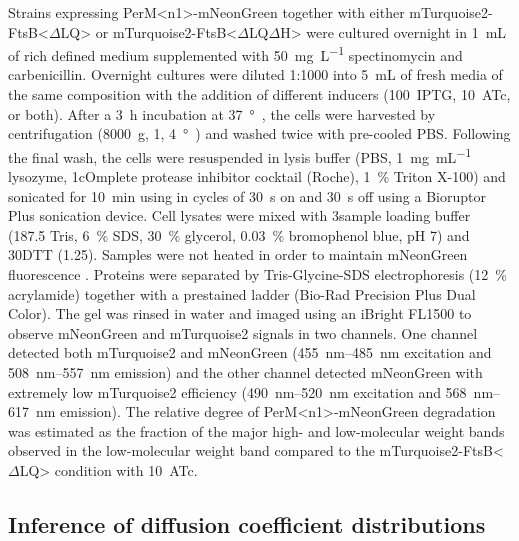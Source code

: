 \documentclass[pdflatex,sn-nature]{sn-jnl}%
\def\textsuperscript#1{<#1>}%
\newcommand\ftsbdLQ{FtsB\textsuperscript{$\Delta{}$LQ}}
\newcommand\ftsbdLQdH{FtsB\textsuperscript{$\Delta{}$LQ$\Delta{}$H}}
\newcommand\permN{PerM\textsuperscript{n1}}
\begin{document}
Strains expressing \permN{}-mNeonGreen together with either mTurquoise2-\ftsbdLQ{} or mTurquoise2-\ftsbdLQdH{} were cultured overnight in \qty{1}{\mL} of rich defined medium supplemented with \qty{50}{\mg\per\L}  spectinomycin and carbenicillin.
Overnight cultures were diluted 1:1000 into \qty{5}{mL} of fresh media of the same composition with the addition of different inducers (\qty{100}{\uM}~IPTG, \qty{10}{\nM}~ATc, or both).
After a \qty{3}{\hour} incubation at \qty{37}{\degree\C}, the cells were harvested by centrifugation (\qty{8000}{g}, \qty{1}{\min}, \qty{4}{\degree\C}) and washed twice with pre-cooled PBS.
Following the final wash, the cells were resuspended in lysis buffer (PBS, \qty{1}{\mg\per\mL} lysozyme, 1\texttimes cOmplete protease inhibitor cocktail (Roche), \qty{1}{\percent} Triton X-100) and sonicated for \qty{10}{min} using in cycles of \qty{30}{s} on and \qty{30}{s} off using a Bioruptor Plus sonication device.
Cell lysates were mixed with 3\texttimes sample loading buffer (\qty{187.5}{\mM} Tris, \qty{6}{\percent} SDS, \qty{30}{\percent} glycerol, \qty{0.03}{\percent} bromophenol blue, pH 7) and 30\texttimes DTT (\qty{1.25}{\molar}).
Samples were not heated in order to maintain mNeonGreen fluorescence \citep{sanialDirectObservationFluorescent2024}.
Proteins were separated by Tris-Glycine-SDS electrophoresis (\qty{12}{\percent} acrylamide) together with a prestained ladder (Bio-Rad Precision Plus Dual Color).
The gel was rinsed in water and imaged using an iBright FL1500 to observe mNeonGreen and mTurquoise2 signals in two channels.
One channel detected both mTurquoise2 and mNeonGreen (\qtyrange{455}{485}{\nm} excitation and \qtyrange{508}{557}{\nm} emission) and the other channel detected mNeonGreen with extremely low mTurquoise2 efficiency (\qtyrange{490}{520}{\nm} excitation and \qtyrange{568}{617}{\nm} emission).
The relative degree of \permN{}-mNeonGreen degradation was estimated as the fraction of the major high- and low-molecular weight bands observed in the low-molecular weight band compared to the mTurquoise2-\ftsbdLQ{} condition with \qty{10}{\nM}~ATc.

\subsection{Inference of diffusion coefficient distributions}
\end{document}
